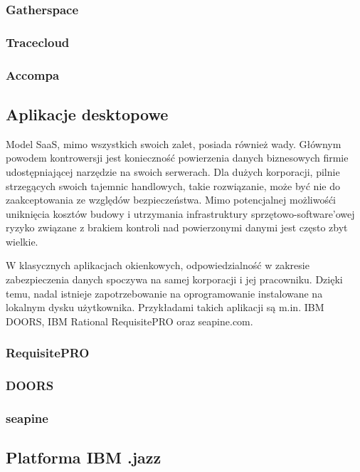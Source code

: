       \subsubsection{Gatherspace}
      \subsubsection{Tracecloud}
      \subsubsection{Accompa}

    \subsection{Aplikacje desktopowe}

      Model SaaS, mimo wszystkich swoich zalet, posiada również wady. Głównym powodem kontrowersji jest konieczność powierzenia danych biznesowych firmie udostępniającej narzędzie na swoich serwerach. Dla dużych korporacji, pilnie strzegących swoich tajemnic handlowych, takie rozwiązanie, może być nie do zaakceptowania ze względów bezpieczeństwa. Mimo potencjalnej możliwośći uniknięcia kosztów budowy i utrzymania infrastruktury sprzętowo-software'owej ryzyko związane z brakiem kontroli nad powierzonymi danymi jest często zbyt wielkie. 

      W klasycznych aplikacjach okienkowych, odpowiedzialność w zakresie zabezpieczenia danych spoczywa na samej korporacji i jej pracowniku. Dzięki temu, nadal istnieje zapotrzebowanie na oprogramowanie instalowane na lokalnym dysku użytkownika. Przykładami takich aplikacji są m.in. IBM DOORS, IBM Rational RequisitePRO oraz seapine.com. 

      \subsubsection{RequisitePRO}
      \subsubsection{DOORS}
      \subsubsection{seapine}

    \subsection{Platforma IBM .jazz}

